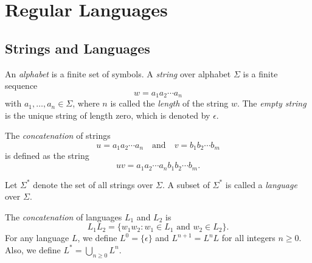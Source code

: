 \chapter{Regular Languages}
\section{Strings and Languages}
\begin{definition}
  An \emph{alphabet} is a finite set of symbols.
  A \emph{string} over alphabet $\Sigma$ is a finite sequence
  \begin{equation*}
    w = a_1 a_2 \cdots a_n
  \end{equation*}
  with $a_1, \dots, a_n \in \Sigma$, where $n$ is called the \emph{length} of
  the string $w$.
  The \emph{empty string} is the unique string of length zero, which is denoted
  by $\epsilon$.
\end{definition}

\begin{definition}
  The \emph{concatenation} of strings
  \begin{equation*}
    u = a_1 a_2 \cdots a_n
    \quad \text{and} \quad
    v = b_1 b_2 \cdots b_m
  \end{equation*}
  is defined as the string
  \begin{equation*}
    uv = a_1 a_2 \cdots a_n b_1 b_2 \cdots b_m.
  \end{equation*}
\end{definition}

\begin{definition}
  Let $\Sigma^*$ denote the set of all strings over $\Sigma$.
  A subset of $\Sigma^*$ is called a \emph{language} over $\Sigma$.
\end{definition}

\begin{definition}
  The \emph{concatenation} of languages $L_1$ and $L_2$ is
  \begin{equation*}
    L_1L_2 = \{w_1w_2 : \text{$w_1 \in L_1$ and $w_2 \in L_2$}\}.
  \end{equation*}
  For any language $L$, we define $L^0 = \{\epsilon\}$ and $L^{n+1} = L^nL$
  for all integers $n \geq 0$.
  Also, we define $L^* = \bigcup_{n \geq 0}L^n$.
\end{definition}

